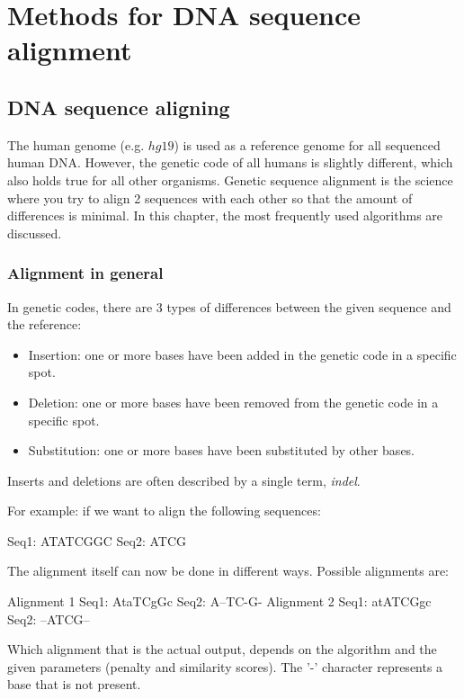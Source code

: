 
\chapter{Methods for DNA sequence alignment}
\label{ch:algoverzicht}


\section{DNA sequence aligning}

The human genome (e.g. $hg19$) is used as a reference genome for all sequenced human DNA. However, the genetic code of all humans is slightly different, which also holds true for all other organisms. Genetic sequence alignment is the science where you try to align 2 sequences with each other so that the amount of differences is minimal. In this chapter, the most frequently used algorithms are discussed.

\subsection{Alignment in general}

In genetic codes, there are 3 types of differences between the given sequence and the reference:

\begin{itemize}
	\item Insertion: one or more bases have been added in the genetic code in a specific spot.
	\item Deletion: one or more bases have been removed from the genetic code in a specific spot.
	\item Substitution: one or more bases have been substituted by other bases.
\end{itemize}

Inserts and deletions are often described by a single term, \emph{indel}.

For example: if we want to align the following sequences:
\begin{lcverbatim}
Seq1: ATATCGGC
Seq2: ATCG
\end{lcverbatim}
The alignment itself can now be done in different ways. Possible alignments are:
\begin{lcverbatim}
Alignment 1
Seq1: AtaTCgGc
Seq2: A--TC-G-
Alignment 2
Seq1: atATCGgc
Seq2: --ATCG--
\end{lcverbatim}
Which alignment that is the actual output, depends on the algorithm and the given parameters (penalty and similarity scores). The '-' character represents a base that is not present.

